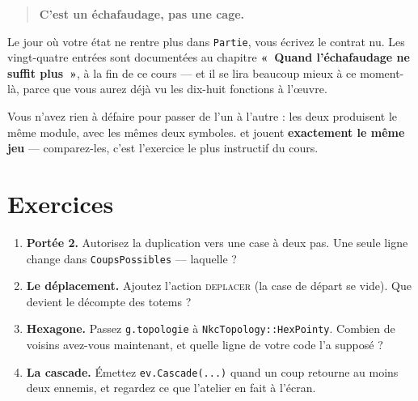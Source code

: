 \begin{quote}
\textbf{C'est un échafaudage, pas une cage.}
\end{quote}

Le jour où votre état ne rentre plus dans \texttt{Partie}, vous écrivez le
contrat nu. Les vingt-quatre entrées sont documentées au chapitre
\textbf{«~Quand l'échafaudage ne suffit plus~»}, à la fin de ce cours --- et il
se lira beaucoup mieux à ce moment-là, parce que vous aurez déjà vu les dix-huit
fonctions à l'œuvre.

Vous n'avez rien à défaire pour passer de l'un à l'autre : les deux produisent le
même module, avec les mêmes deux symboles.  et
 jouent \textbf{exactement le même jeu} ---
comparez-les, c'est l'exercice le plus instructif du cours.

\section*{Exercices}

\begin{enumerate}
  \item \textbf{Portée 2.} Autorisez la duplication vers une case à deux pas.
        Une seule ligne change dans \texttt{CoupsPossibles} --- laquelle ?
  \item \textbf{Le déplacement.} Ajoutez l'action \textsc{deplacer} (la case de
        départ se vide). Que devient le décompte des totems ?
  \item \textbf{Hexagone.} Passez \texttt{g.topologie} à
        \texttt{NkcTopology::HexPointy}. Combien de voisins avez-vous
        maintenant, et quelle ligne de votre code l'a supposé ?
  \item \textbf{La cascade.} Émettez \texttt{ev.Cascade(...)} quand un coup
        retourne au moins deux ennemis, et regardez ce que l'atelier en fait à
        l'écran.
\end{enumerate}
